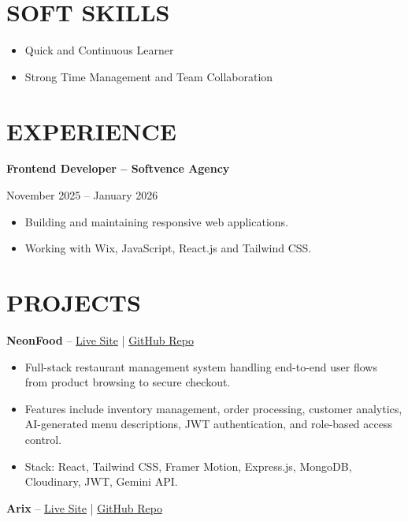 \documentclass[10pt,a4paper]{article}
\begin{document}
\section*{SOFT SKILLS}

\begin{itemize}
\item Quick and Continuous Learner
\item Strong Time Management and Team Collaboration
\end{itemize}


\section*{EXPERIENCE}

\textbf{Frontend Developer -- Softvence Agency}

November 2025 -- January 2026

\begin{itemize}
\item Building and maintaining responsive web applications.
\item Working with Wix, JavaScript, React.js and Tailwind CSS.
\end{itemize}


\section*{PROJECTS}

\textbf{NeonFood}
--
\href{https://neon-food.vercel.app/}{Live Site}
|
\href{https://github.com/sakibnjr/NeonFood}{GitHub Repo}

\begin{itemize}
    \item Full-stack restaurant management system handling end-to-end user flows from product browsing to secure checkout.
    \item Features include inventory management, order processing, customer analytics, AI-generated menu descriptions, JWT authentication, and role-based access control.
    \item Stack: React, Tailwind CSS, Framer Motion, Express.js, MongoDB, Cloudinary, JWT, Gemini API.
\end{itemize}

\textbf{Arix}
--
\href{https://arix-ecommerce.vercel.app/}{Live Site}
|
\href{https://github.com/sakibnjr/arix-ecommerce}{GitHub Repo}
\end{document}
